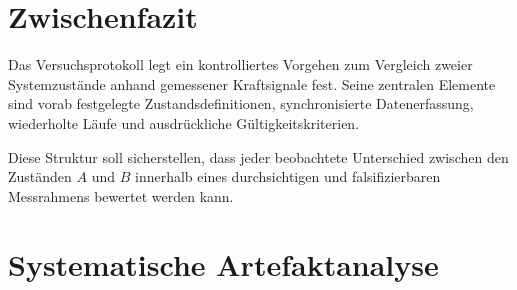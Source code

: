 \documentclass[12pt,a4paper]{report}
\begin{document}
\section{Zwischenfazit}

Das Versuchsprotokoll legt ein kontrolliertes Vorgehen zum Vergleich
zweier Systemzustände anhand gemessener Kraftsignale fest. Seine
zentralen Elemente sind vorab festgelegte Zustandsdefinitionen,
synchronisierte Datenerfassung, wiederholte Läufe und ausdrückliche
Gültigkeitskriterien.

Diese Struktur soll sicherstellen, dass jeder beobachtete Unterschied
zwischen den Zuständen $A$ und $B$ innerhalb eines durchsichtigen und
falsifizierbaren Messrahmens bewertet werden kann.

\section{Systematische Artefaktanalyse}
\end{document}
